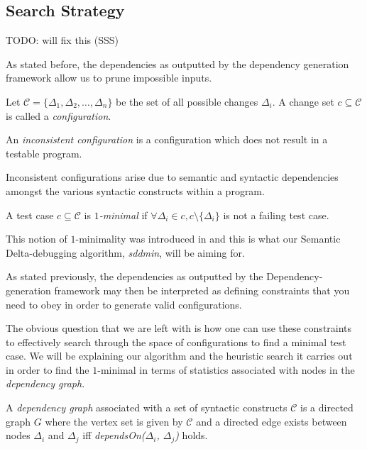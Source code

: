 \documentclass[preprint]{acm_proc_article-sp}
\newenvironment{definition}[1][Definition]{\begin{trivlist}
\item[\hskip \labelsep {\bfseries #1}]}{\end{trivlist}}
\begin{document}
\subsection{Search Strategy}
TODO: will fix this (SSS)

As stated before, the dependencies as outputted by the dependency generation
framework allow us to prune impossible inputs. 

\begin{definition}
Let $\mathcal{C} = \{ \Delta_1, \Delta_2, \ldots, \Delta_n \}$ be the set of all
possible changes $\Delta_i$. A change set $c \subseteq \mathcal{C}$ is called a
\emph{configuration}.
\end{definition}

\begin{definition}
An \emph{inconsistent configuration} is a configuration which does not result in
a testable program.
\end{definition}

Inconsistent configurations arise due to semantic and syntactic dependencies
amongst the various syntactic constructs within a program.

\begin{definition}
A test case $c \subseteq \mathcal{C}$ is \emph{$1$-minimal} if $\forall \Delta_i
\in c, c \setminus \{ \Delta_i \}$ is not a failing test case.
\end{definition}

This notion of $1$-minimality was introduced in \citep{zeller99} and this is
what our Semantic Delta-debugging algorithm, \emph{sddmin}, will be aiming
for. 

As stated previously, the dependencies as outputted by the Dependency-generation
framework may then be interpreted as defining constraints that you need to obey
in order to generate valid configurations.

The obvious question that we are left with is how one can use these constraints
to effectively search through the space of configurations to find a minimal test
case. We will be explaining our algorithm and the heuristic search it carries
out in order to find the $1$-minimal in terms of statistics associated with
nodes in the \emph{dependency graph}.

\begin{definition}
A \emph{dependency graph} associated with a set of syntactic constructs
$\mathcal{C}$ is a directed graph $G$ where the vertex set is given by
$\mathcal{C}$ and a directed edge exists between nodes $\Delta_i$ and $\Delta_j$
iff \emph{dependsOn($\Delta_i$, $\Delta_j$)} holds.
\end{definition}
\end{document}
